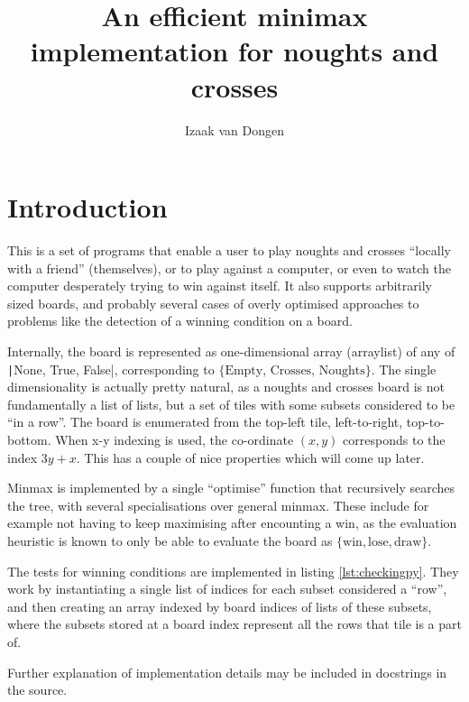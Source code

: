 \documentclass[a4paper,11pt]{article}
\title{An efficient minimax implementation for noughts and crosses}
\author{Izaak van Dongen}
\begin{document}
    \maketitle\thispagestyle{empty} %
    \tableofcontents
    \listoflistings

    \section{Introduction}

    This is a set of programs that enable a user to play noughts and crosses
    ``locally with a friend'' (themselves), or to play against a computer, or
    even to watch the computer desperately trying to win against itself. It also
    supports arbitrarily sized boards, and probably several cases of overly
    optimised approaches to problems like the detection of a winning condition
    on a board.

    Internally, the board is represented as one-dimensional array (arraylist) of
    any of \texttt|{None, True, False}|, corresponding to
    $\{\text{Empty, Crosses, Noughts}\}$. The single dimensionality is actually
    pretty natural, as a noughts and crosses board is not fundamentally a list
    of lists, but a set of tiles with some subsets considered to be ``in a
    row''. The board is enumerated from the top-left tile, left-to-right,
    top-to-bottom. When x-y indexing is used, the co-ordinate $(x,y)$
    corresponds to the index $3y+x$. This has a couple of nice properties which
    will come up later.

    Minmax is implemented by a single ``optimise'' function that recursively
    searches the tree, with several specialisations over general minmax. These
    include for example not having to keep maximising after encounting a win, as
    the evaluation heuristic is known to only be able to evaluate the board as
    $\{\text{win}, \text{lose}, \text{draw}\}$.

    The tests for winning conditions are implemented in listing
    \ref{lst:checkingpy}. They work by instantiating a single list of indices
    for each subset considered a ``row'', and then creating an array indexed by
    board indices of lists of these subsets, where the subsets stored at a board
    index represent all the rows that tile is a part of.

    Further explanation of implementation details may be included in docstrings
    in the source.
\end{document}
